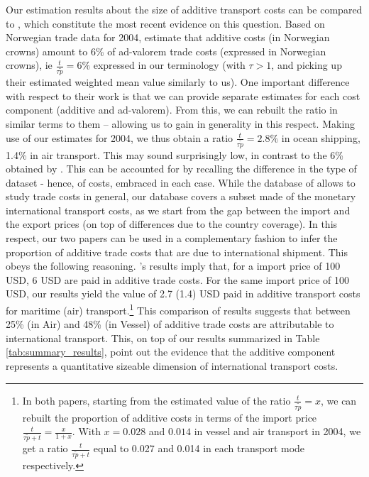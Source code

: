 \documentclass[a4paper,11pt]{article}
\begin{document}
Our estimation results about the size of additive transport costs can be compared to \citet{Irrazabal_2015}, which constitute the most recent evidence on this question. Based on Norwegian trade data for 2004, \citet{Irrazabal_2015} estimate that additive costs (in Norwegian crowns) amount to 6\% of ad-valorem trade costs (expressed in Norwegian crowns), ie $\frac{t}{\tau\widetilde{p}}=6\%$ expressed in our terminology (with $\tau>1$, and picking up their estimated weighted mean value similarly to us). One important difference with respect to their work is that we can provide separate estimates for each cost component (additive and ad-valorem). From this, we can rebuilt the ratio in similar terms to them -- allowing us to gain in generality in this respect. Making use of our estimates for 2004, we thus obtain a ratio $\frac{t}{\tau\widetilde{p}}=2.8\%$ in ocean shipping, 1.4\% in air transport. This may sound surprisingly low, in contrast to the 6\% obtained by \citet{Irrazabal_2015}. This can be accounted for by recalling the difference in the type of dataset - hence, of costs, embraced in each case. While the database of \citet{Irrazabal_2015} allows to study trade costs in general, our database covers a subset made of the monetary international transport costs, as we start from the gap between the import and the export prices (on top of differences due to the country coverage). In this respect, our two papers can be used in a complementary fashion to infer the proportion of additive trade costs that are due to international shipment. This obeys the following reasoning. \citet{Irrazabal_2015}'s results imply that, for a import price of 100 USD, 6 USD are paid in additive trade costs. For the same import price of 100 USD, our results yield the value of 2.7 (1.4) USD paid in additive transport costs for maritime (air) transport.\footnote{In both papers, starting from the estimated value of the ratio $\frac{t}{\tau \widetilde{p}}= x$, we can rebuilt the proportion of additive costs in terms of the import price $\frac{t}{\tau \widetilde{p} + t} = \frac{x}{1+x}$. With $x = 0.028$ and $0.014$ in vessel and air transport  in 2004, we get a ratio $\frac{t}{\tau \widetilde{p} + t}$ equal to 0.027 and 0.014 in each transport mode respectively.} This comparison of results suggests that between 25\% (in Air) and 48\% (in Vessel) of additive trade costs are attributable to international transport. This, on top of our results summarized in Table \ref{tab:summary_results}, point out the evidence that the additive component represents a quantitative sizeable dimension of international transport costs. 
\end{document}
